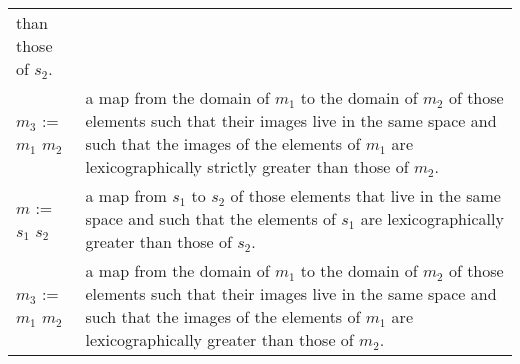 \begin{supertabular}{p{0.35\textwidth}p{0.6\textwidth}}
than those of $s_2$.
\\
$m_3$ := $m_1$ \ai[\tt]{>>} $m_2$ & a map from the domain of
$m_1$ to the domain of $m_2$ of those elements such that their images
live in the same space and such that the images of the elements of
$m_1$ are lexicographically strictly greater than those of $m_2$.
\\
$m$ := $s_1$ \ai[\tt]{>>=} $s_2$ & a map from
$s_1$ to $s_2$ of those elements that live in the same space and
such that the elements of $s_1$ are lexicographically greater
than those of $s_2$.
\\
$m_3$ := $m_1$ \ai[\tt]{>>=} $m_2$ & a map from the domain of
$m_1$ to the domain of $m_2$ of those elements such that their images
live in the same space and such that the images of the elements of
$m_1$ are lexicographically greater than those of $m_2$.
\\
\end{supertabular}
